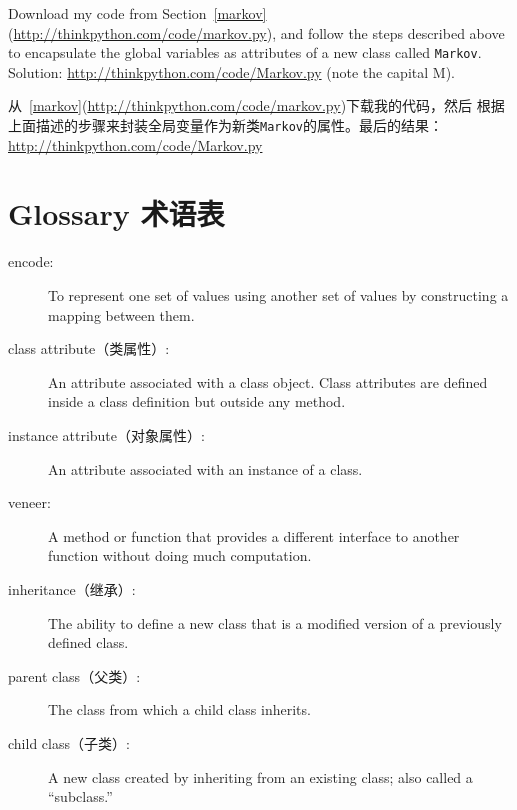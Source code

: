 \documentclass[10pt]{book}
\begin{document}
\begin{CJK}{UTF8}{gbsn}
\begin{exercise}

Download my code from Section~\ref{markov}
(\url{http://thinkpython.com/code/markov.py}), and follow the steps described
above to encapsulate the global variables as attributes of a new class
called {\tt Markov}.  Solution: \url{http://thinkpython.com/code/Markov.py}
(note the capital M).

从~\ref{markov}(\url{http://thinkpython.com/code/markov.py})下载我的代码，然后
根据上面描述的步骤来封装全局变量作为新类{\tt Markov}的属性。最后的结果：
\url{http://thinkpython.com/code/Markov.py}

\end{exercise}




\section{Glossary 术语表}

\begin{description}

\item[encode:]  To represent one set of values using another
set of values by constructing a mapping between them.

\item[class attribute（类属性）:] An attribute associated with a class
object.  Class attributes are defined inside
a class definition but outside any method.

\item[instance attribute（对象属性）:] An attribute associated with an
instance of a class.

\item[veneer:] A method or function that provides a different
interface to another function without doing much computation.

\item[inheritance（继承）:] The ability to define a new class that is a
modified version of a previously defined class.

\item[parent class（父类）:] The class from which a child class inherits.

\item[child class（子类）:] A new class created by inheriting from an
existing class; also called a ``subclass.''


\end{description}
\end{CJK}
\end{document}
